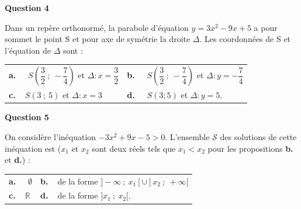 \documentclass[10pt]{article}
\providecommand{\R}{\mathbb{R}}
\begin{document}
\medskip

\textbf{Question 4}

\medskip 

Dans un repère orthonormé, la parabole d’équation $y=3x^2-9x+5$ a pour sommet le point S et pour axe de symétrie la droite $\Delta$. Les coordonnées de S et l’équation de $\Delta$ sont :

\medskip
\begin{tabularx}{\linewidth}{*{2}{X}}
\textbf{a.~~} $ S\left(\dfrac{3}{2}~;~-\dfrac{7}{4}\right)$ et $\Delta : x=\dfrac{3}{2}$ &\textbf{b.~~} $S\left(\dfrac{3}{2}~;~-\dfrac{7}{4}\right)$ et $\Delta : y=-\dfrac{7}{4}$\\\textbf{c.~~}$ S(3~;~5) $ et $\Delta : x = 3$ & \textbf{d.~~} $S(3 ;5)$ et $\Delta : y = 5$.
\end{tabularx}

\medskip

\textbf{Question 5}

\medskip 

On considère l’inéquation $- 3x^2 + 9x-5 > 0$. L’ensemble $\mathscr{S}$ des solutions de cette inéquation est ($x_1$ et $x_2$ sont deux réels tels que $x_1< x_2 $ pour les propositions \textbf{b.} et \textbf{d.}) :

\medskip

\begin{tabularx}{\linewidth}{*{2}{X}}
\textbf{a.~~} $ \emptyset$ &\textbf{b.~~}de la forme $]-\infty~;~x_1 [ \cup ] x_2~;~+\infty [ $\\\textbf{c.~~}$\R $& \textbf{d.~~}de la forme $  ] x_1~;~x_2 [  $.
\end{tabularx}

\vspace{0.5cm}
\end{document}
